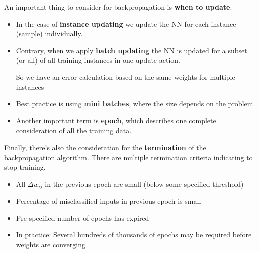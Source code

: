 An important thing to consider for backpropagation is \textbf{when to update}:
\begin{itemize}
  \item In the case of \textbf{instance updating} we update the NN for each instance (sample) individually.
  \item Contrary, when we apply \textbf{batch updating} the NN is updated for a subset (or all) of all training instances in one update action. \begin{note}So we have an error calculation based on the same weights for multiple instances\end{note}
  \item Best practice is using \textbf{mini batches}, where the size depends on the problem.
  \item Another important term is \textbf{epoch}, which describes one complete consideration of all the training data.
\end{itemize}

Finally, there's also the consideration for the \textbf{termination} of the backpropagation algorithm. There are multiple termination criteria indicating to stop training.
\begin{itemize}
  \item All $\Delta w_{ij}$ in the previous epoch are small (below some specified threshold)
  \item Percentage of misclassified inputs in previous epoch is small
  \item Pre-specified number of epochs has expired
  \item In practice: Several hundreds of thousands of epochs may be required before weights are converging
\end{itemize}
